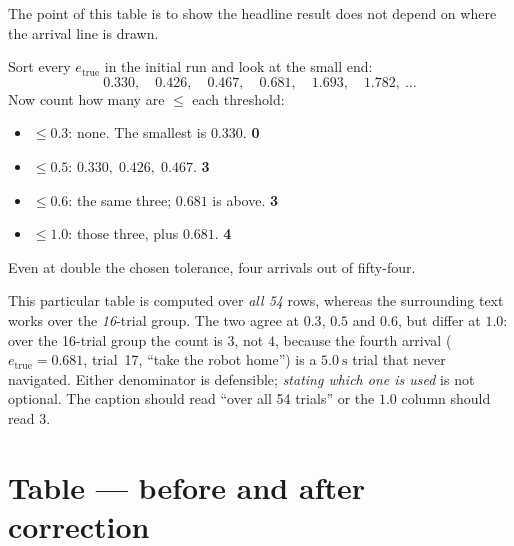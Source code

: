 \documentclass[11pt,a4paper]{report}
\begin{document}
The point of this table is to show the headline result does not depend on
where the arrival line is drawn.

\begin{handbox}
Sort every $e_{\text{true}}$ in the initial run and look at the small end:
\[
0.330,\quad 0.426,\quad 0.467,\quad 0.681,\quad 1.693,\quad 1.782,\ \ldots
\]
Now count how many are $\le$ each threshold:
\begin{itemize}[leftmargin=1.4em,itemsep=1pt]
\item $\le 0.3$: none. The smallest is $0.330$. \textbf{0} \checkmark
\item $\le 0.5$: $0.330,\; 0.426,\; 0.467$. \textbf{3} \checkmark
\item $\le 0.6$: the same three; $0.681$ is above. \textbf{3} \checkmark
\item $\le 1.0$: those three, plus $0.681$. \textbf{4} \checkmark
\end{itemize}
Even at double the chosen tolerance, four arrivals out of fifty-four.
\end{handbox}

\begin{warnbox}
This particular table is computed over \emph{all 54} rows, whereas the
surrounding text works over the \emph{16}-trial group. The two agree at
$0.3$, $0.5$ and $0.6$, but differ at $1.0$: over the 16-trial group the count
is $3$, not $4$, because the fourth arrival ($e_{\text{true}} = 0.681$,
trial~17, ``take the robot home'') is a $\SI{5.0}{\second}$ trial that never
navigated. Either denominator is defensible; \emph{stating which one is used}
is not optional. The caption should read ``over all 54 trials'' or the $1.0$
column should read $3$.
\end{warnbox}

\section{Table --- before and after correction}
\end{document}
